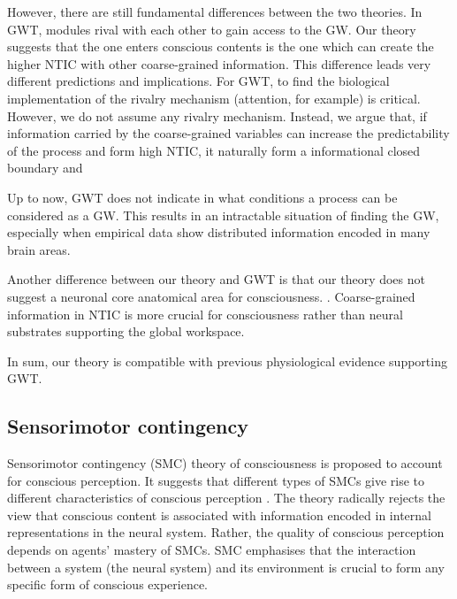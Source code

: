\documentclass[utf8]{article}
\begin{document}
		However, there are still fundamental differences between the two theories. 
		In GWT, modules rival with each other to gain access to the GW. Our theory suggests that the one enters conscious contents is the one which can create the higher NTIC with other coarse-grained information. This difference leads very different predictions and implications. For GWT, to find the biological implementation of the rivalry mechanism (attention, for example) is critical. However, we do not assume any rivalry mechanism. Instead, we argue that, if  information carried by the coarse-grained variables can increase the predictability of the process and form high NTIC,  it naturally form a informational closed boundary and 
		
		Up to now, GWT does not indicate in what conditions a process can be considered as a GW. This results in an intractable situation of finding the GW, especially when empirical data show distributed information encoded in many brain areas\citep{siegel2015cortical}. 
		
		Another difference between our theory and GWT is that our theory does not suggest a neuronal core anatomical area for consciousness. . Coarse-grained information in NTIC is more crucial for consciousness rather than neural substrates supporting the global workspace.
		
		In sum, our theory is compatible with previous physiological evidence supporting GWT.  


		\subsection{Sensorimotor contingency}
		Sensorimotor contingency (SMC) theory of consciousness is proposed to account for conscious perception. It suggests that different types of SMCs give rise to different characteristics of conscious perception \cite{o2001sensorimotor}. The theory radically rejects the view that conscious content is associated with information encoded in internal representations in the neural system. Rather, the quality of conscious perception depends on agents' mastery of SMCs. SMC emphasises that the interaction between a system (the neural system) and its environment is crucial to form any specific form of conscious experience. 
	
\end{document}
